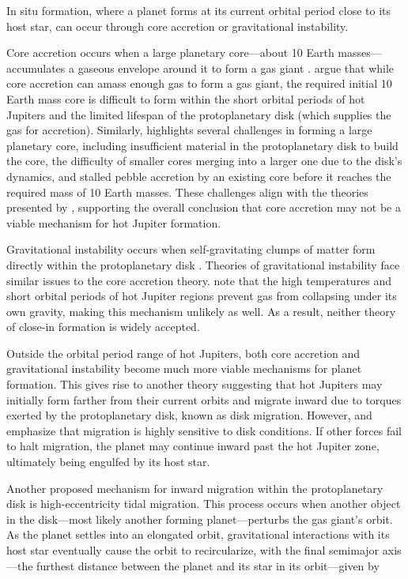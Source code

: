 \documentclass[oneside,12pt]{amsart}
\numberwithin{page}{section}
\begin{document}
In situ formation, where a planet forms at its current orbital period close to its host star, can occur through core accretion or gravitational instability. 

Core accretion occurs when a large planetary core—about 10 Earth masses—accumulates a gaseous envelope around it to form a gas giant \citep{helled2013giant}. \citet{dawson2018origins} argue that while core accretion can amass enough gas to form a gas giant, the required initial 10 Earth mass core is difficult to form within the short orbital periods of hot Jupiters and the limited lifespan of the protoplanetary disk (which supplies the gas for accretion). Similarly, \citet{fortney2021hotjupiters} highlights several challenges in forming a large planetary core, including insufficient material in the protoplanetary disk to build the core, the difficulty of smaller cores merging into a larger one due to the disk's dynamics, and stalled pebble accretion by an existing core before it reaches the required mass of 10 Earth masses. These challenges align with the theories presented by \citet{dawson2018origins}, supporting the overall conclusion that core accretion may not be a viable mechanism for hot Jupiter formation.

Gravitational instability occurs when self-gravitating clumps of matter form directly within the protoplanetary disk \citep{helled2013giant}. Theories of gravitational instability face similar issues to the core accretion theory. \citet{dawson2018origins} note that the high temperatures and short orbital periods of hot Jupiter regions prevent gas from collapsing under its own gravity, making this mechanism unlikely as well. As a result, neither theory of close-in formation is widely accepted.

Outside the orbital period range of hot Jupiters, both core accretion and gravitational instability become much more viable mechanisms for planet formation. This gives rise to another theory suggesting that hot Jupiters may initially form farther from their current orbits and migrate inward due to torques exerted by the protoplanetary disk, known as disk migration. However, \citet{fortney2021hotjupiters} and \citet{dawson2018origins} emphasize that migration is highly sensitive to disk conditions. If other forces fail to halt migration, the planet may continue inward past the hot Jupiter zone, ultimately being engulfed by its host star.

Another proposed mechanism for inward migration within the protoplanetary disk is high-eccentricity tidal migration. This process occurs when another object in the disk—most likely another forming planet—perturbs the gas giant’s orbit. As the planet settles into an elongated orbit, gravitational interactions with its host star eventually cause the orbit to recircularize, with the final semimajor axis—the furthest distance between the planet and its star in its orbit—given by
\end{document}
